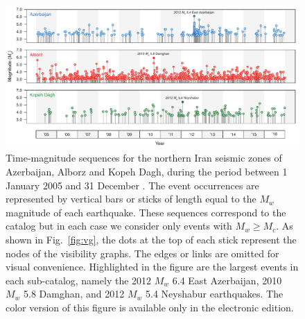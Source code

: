 
\begin{figure}%
	\centering
	\includegraphics[width=\textwidth]{figures/pdf/figure-05} 
	\caption{Time-magnitude sequences for the northern Iran seismic zones of Azerbaijan, Alborz and Kopeh Dagh, during the period between 1 January 2005 and 31 December . The event occurrences are represented by vertical bars or sticks of length equal to the $M_w$ magnitude of each earthquake. These sequences correspond to the  catalog but in each case we consider only events with $M_w \geq M_c$. As shown in Fig.~\ref{fig:vg}, the dots at the top of each stick represent the nodes of the visibility graphs. The edges or links are omitted for visual convenience. Highlighted in the figure are the largest events in each sub-catalog, namely the 2012 $M_w$ 6.4 East Azerbaijan, 2010 $M_w$ 5.8 Damghan, and 2012 $M_w$ 5.4 Neyshabur earthquakes. The color version of this figure is available only in the electronic edition.}
	\label{fig:mag-time}
\end{figure}

